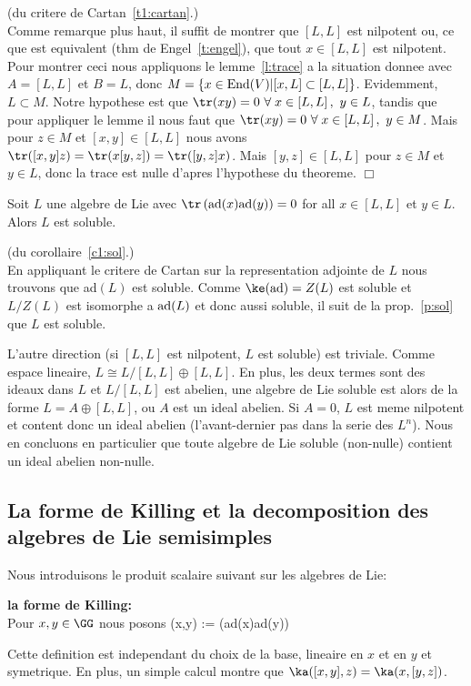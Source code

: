 \begin{prv}(du critere de Cartan~\ref{t1:cartan}.)\\
Comme remarque plus haut, il suffit de montrer que $[L,L]$ est nilpotent ou, ce que est equivalent (thm de Engel~\ref{t:engel}), 
que tout $x\in [L,L]$ est nilpotent. Pour montrer ceci nous appliquons le lemme~\ref{l:trace} a la situation donnee avec $A=[L,L]$ et $B=L$, donc $M=\{x\in {\rm End}(V)| [x,L]\subset [L,L]\}$. Evidemment, $L\subset M$. Notre hypothese est que $\tr(xy)=0~\forall\; x\in [L,L]\,,~ y\in L$, tandis que pour appliquer le lemme il nous faut que 
$\tr(xy)=0~\forall\; x\in [L,L]\,,~ y\in M$. Mais pour $z\in M$ et $[x,y]\in [L,L]$ nous avons
$\tr([x,y]z) = \tr(x[y,z])=\tr([y,z]x)$. Mais $[y,z]\in [L,L]$ pour $z\in M$ et $y\in L$, donc la trace est nulle 
d'apres l'hypothese du theoreme. \hfill $\Box$
\end{prv}

\begin{ccc}\label{c1:sol} Soit $L$ une algebre de Lie avec $\tr\left({\rm ad}(x){\rm ad}(y)\right) =0$ 
for all $x\in [L,L]$ et $y\in L$. Alors $L$ est soluble.
\end{ccc}

\begin{prv}(du corollaire~\ref{c1:sol}.)\\
En appliquant le critere de Cartan sur la representation adjointe de $L$ nous trouvons que ad$(L)$ est soluble.
Comme $\ke({\rm ad}) =Z(L)$ est soluble et $L/Z(L)$ est isomorphe a ${\rm ad}(L)$ et donc aussi soluble, 
il suit de la prop.~\ref{p:sol} que $L$ est soluble.
\end{prv}
L'autre direction (si $[L,L]$ est nilpotent, $L$ est soluble) est triviale.
Comme espace lineaire, $L \cong L/[L,L] \oplus [L,L]$. En plus, les deux termes sont des ideaux dans $L$ et
$L/[L,L]$ est abelien, une algebre de Lie soluble est alors de la forme
$ L = A \oplus [L,L]$, ou $A$ est un ideal abelien. Si $A=0$, $L$ est meme nilpotent et content donc un ideal
abelien (l'avant-dernier pas dans la serie des $L^n$). Nous en concluons en particulier que toute algebre de Lie soluble (non-nulle) contient un ideal abelien non-nulle.

\subsection{La forme de Killing et la decomposition des algebres de Lie  semisimples}  

Nous introduisons le produit scalaire suivant sur les algebres de Lie:
\begin{ddd} {\bf la forme de Killing:}\\
Pour $x,y\in \GG$ nous posons
\be
\ka(x,y) := \tr({\rm ad}(x){\rm ad}(y))
\ee
\end{ddd}
Cette definition est independant du choix de la base, lineaire en $x$ et en $y$ et symetrique. En plus,
un simple calcul montre que $\ka([x,y],z) = \ka(x,[y,z])$.

